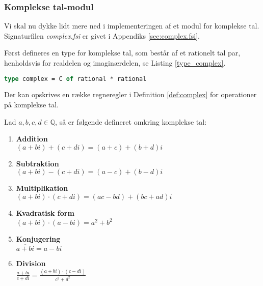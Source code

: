 \subsubsection{Komplekse tal-modul}
Vi skal nu dykke lidt mere ned i implementeringen af et modul for komplekse tal. Signaturfilen \textit{complex.fsi} er givet i Appendiks \ref{sec:complex.fsi}. 

Først defineres en type for komplekse tal, som består af et rationelt tal par, henholdsvis for realdelen og imaginærdelen, se Listing \ref{type_complex}.

\begin{lstlisting}[language={FSharp}, 
    label={type_complex},
    caption={Typen for komplekse tal}]
type complex = C of rational * rational
\end{lstlisting}

Der kan opskrives en række regneregler i Definition \ref{def:complex} for operationer på komplekse tal. 
\vspace{0.5cm}
\begin{definition}\label{def:complex}
  Lad $a, b, c, d \in \mathbb{Q}$, så er følgende defineret omkring komplekse tal:
  \begin{enumerate}
    \item \textbf{Addition} \\ $(a + bi) + (c + di) = (a + c) + (b + d)i$
    \item \textbf{Subtraktion} \\ $(a + bi) - (c + di) = (a - c) + (b - d)i$
    \item \textbf{Multiplikation} \\ $(a + bi) \cdot (c + di) = (ac - bd) + (bc + ad)i$
    \item \textbf{Kvadratisk form} \\ $ (a + bi) \cdot (a - bi) = a^2 + b^2$
    \item \textbf{Konjugering} \\ $\overline{a + bi} = a - bi$
    \item \textbf{Division} \\ $\frac{a + bi}{c + di} = \frac{(a + bi)\cdot(c - di)}{c^2 + d^2}$
  \end{enumerate}
\end{definition}


